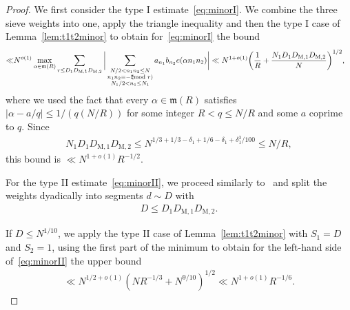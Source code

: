 \documentclass[12pt]{amsart}
\theoremstyle{definition}
\theoremstyle{remark}
\numberwithin{equation}{section}
\newcommand{\1}{\mathbf{1}}
\let\oldpmod\pmod
\renewcommand{\pmod}[1]{\hspace{-0.12cm}\oldpmod {#1}}
\begin{document}
\begin{proof}
We first consider the type I estimate~\eqref{eq:minorI}. We combine the three sieve weights into one, apply the triangle inequality and then the type I case of Lemma~\ref{lem:t1t2minor} to obtain for~\eqref{eq:minorI} the bound
\begin{align*}
    \ll& N^{o(1)} \max_{\alpha \in \mathfrak{m}(R)} \sum_{r\leq D_{1}D_{\mathrm{M},1}D_{\mathrm{M},2}} \bigg| \sum_{\substack{N/2< n_1 n_2\leq N\\ n_1n_2\equiv -2 \pmod{r}\\ N_1/2<n_1\leq N_1 }} a_{n_1}b_{n_2} e(\alpha n_1n_2) \bigg|\ll N^{1+o(1)} \bigg(\frac{1}{R}+\frac{N_1  D_{1}D_{\mathrm{M},1}D_{\mathrm{M},2}}{N}\bigg)^{1/2},
\end{align*}
where we used the fact that every $\alpha \in \mathfrak{m}(R)$ satisfies $|\alpha-a/q|\leq 1/(q(N/R))$ for some integer $R<q\leq N/R$ and some $a$ coprime to $q$. 
Since 
\begin{align*}
    N_1  D_{1}D_{\mathrm{M},1}D_{\mathrm{M},2}\leq N^{1/3+1/3-\delta_1+1/6-\delta_1+\delta_1^3/100}\leq N/R,
\end{align*}
this bound is $\ll N^{1+o(1)}R^{-1/2}$.

For the type II estimate~\eqref{eq:minorII}, we proceed similarly to~\cite[end of proof of Proposition 9]{matomaki} and split the weights dyadically into segments $d\sim D$ with 
\begin{align*}
    D\leq D_{1}D_{\mathrm{M},1}D_{\mathrm{M},2}.
\end{align*}    

If $D\leq N^{1/10}$, we apply the type II case of Lemma~\ref{lem:t1t2minor} with $S_1=D$ and $S_2=1$, using the first part of the minimum to obtain for the left-hand side of~\eqref{eq:minorII} the upper bound
\begin{align*}
    \ll N^{1/2+o(1)} \left(NR^{-1/3}+N^{9/10} \right)^{1/2}\ll N^{1+o(1)} R^{-1/6}.
\end{align*}


\end{proof}
\end{document}
